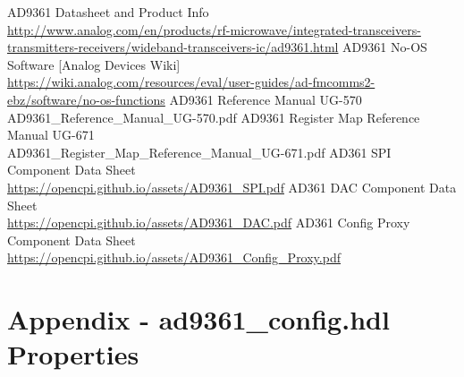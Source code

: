 \documentclass{article}
\def\comp{ad9361\_config}
\begin{document}
\begin{thebibliography}{1}

 AD9361 Datasheet and Product Info \\
\url{http://www.analog.com/en/products/rf-microwave/integrated-transceivers-transmitters-receivers/wideband-transceivers-ic/ad9361.html}
 AD9361 No-OS Software [Analog Devices Wiki]\\
\url{https://wiki.analog.com/resources/eval/user-guides/ad-fmcomms2-ebz/software/no-os-functions}
 AD9361 Reference Manual UG-570\\
AD9361\_Reference\_Manual\_UG-570.pdf
 AD9361 Register Map Reference Manual UG-671\\
AD9361\_Register\_Map\_Reference\_Manual\_UG-671.pdf
 AD361 SPI Component Data Sheet \\
\url{https://opencpi.github.io/assets/AD9361_SPI.pdf}
 AD361 DAC Component Data Sheet \\
\url{https://opencpi.github.io/assets/AD9361_DAC.pdf}
 AD361 Config Proxy Component Data Sheet \\
\url{https://opencpi.github.io/assets/AD9361_Config_Proxy.pdf}

\end{thebibliography}
\pagebreak
\landscape
\section{Appendix - \comp{}.hdl Properties}
\label{appendix:properties}
\begin{scriptsize}

\end{scriptsize}
\pagebreak
\end{document}
